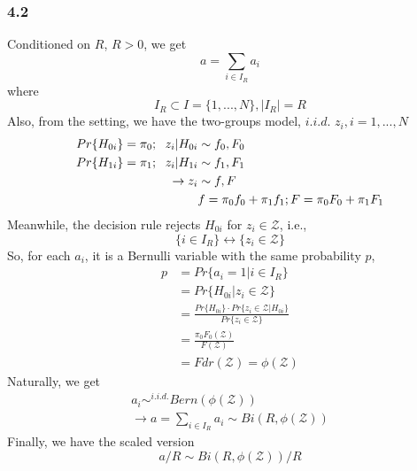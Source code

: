 \documentclass{article}\usepackage{graphicx, color}
\begin{document}
\subsubsection*{4.2}
Conditioned on $R$, $R>0$, we get
\begin{displaymath}
a = \sum_{i\in I_R} a_i
\end{displaymath}
where 
\begin{displaymath}
I_R \subset I = \{1,...,N\}, |I_R| = R
\end{displaymath}
Also, from the setting, we have the two-groups model, $i.i.d.$ $z_i, i=1,...,N$
\begin{displaymath}
\begin{split}
Pr\{H_{0i}\}=\pi_0; \hspace{6 pt} z_i | H_{0i} &\sim f_0, F_0 \\
Pr\{H_{1i}\}=\pi_1; \hspace{6 pt} z_i | H_{1i} &\sim f_1, F_1 \\
\rightarrow z_i &\sim f,F \\
&f=\pi_0f_0+\pi_1f_1; F=\pi_0F_0 + \pi_1F_1
\end{split}
\end{displaymath}
Meanwhile, the decision rule rejects $H_{0i}$ for $z_i \in \mathcal{Z}$, i.e.,
\begin{displaymath}
\{i \in I_R\} \leftrightarrow \{z_i \in \mathcal{Z} \}
\end{displaymath}
So, for each $a_i$, it is a Bernulli variable with the same probability $p$,
\begin{displaymath}
\begin{split}
p &= Pr\{ a_i=1 | i\in I_R \} \\
&= Pr\{ H_{0i} | z_i\in \mathcal{Z} \} \\
&= \frac{Pr\{ H_{0i} \} \cdot Pr\{ z_i\in \mathcal{Z} | H_{0i}\}}{Pr\{ z_i\in \mathcal{Z} \}} \\
&= \frac{\pi_0 F_0(\mathcal{Z})}{F(\mathcal{Z})} \\
&= Fdr(\mathcal{Z}) = \phi(\mathcal{Z})
\end{split}
\end{displaymath}
Naturally, we get
\begin{displaymath}
\begin{split}
a_i \sim^{i.i.d.} Bern(\phi(\mathcal{Z})) \\
\rightarrow a =\sum_{i\in I_R} a_i \sim Bi(R, \phi(\mathcal{Z})) 
\end{split}
\end{displaymath}
Finally, we have the scaled version
\begin{displaymath}
a/R \sim Bi(R, \phi(\mathcal{Z}))/R
\end{displaymath}
 
\end{document}
